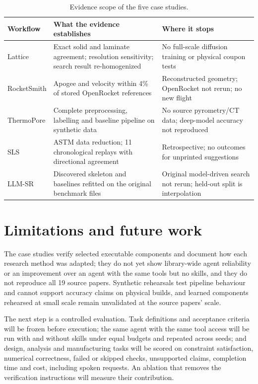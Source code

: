 \documentclass[11pt]{article}
\begin{document}
\begin{table}[t]
\centering\small
\caption{Evidence scope of the five case studies.}
\label{tab:rerun-scope}
\begin{tabularx}{\textwidth}{@{}>{\raggedright\arraybackslash}p{2.2cm} >{\raggedright\arraybackslash}X >{\raggedright\arraybackslash}X@{}}
\toprule
Workflow & What the evidence establishes & Where it stops\\
\midrule
Lattice & Exact solid and laminate agreement; resolution sensitivity; search result re-homogenized & No full-scale diffusion training or physical coupon tests\\[3pt]
RocketSmith & Apogee and velocity within 4\% of stored OpenRocket references & Reconstructed geometry; OpenRocket not rerun; no new flight\\[3pt]
ThermoPore & Complete preprocessing, labelling and baseline pipeline on synthetic data & No source pyrometry/CT data; deep-model accuracy not reproduced\\[3pt]
SLS & ASTM data reduction; 11 chronological replays with directional agreement & Retrospective; no outcomes for unprinted suggestions\\[3pt]
LLM-SR & Discovered skeleton and baselines refitted on the original benchmark files & Original model-driven search not rerun; held-out split is interpolation\\
\bottomrule
\end{tabularx}
\end{table}

\section{Limitations and future work}
\label{sec:limits}
The case studies verify selected executable components and document how each research method was
adapted; they do not yet show library-wide agent reliability or an improvement over an agent with
the same tools but no skills, and they do not reproduce all 19 source papers. Synthetic rehearsals
test pipeline behaviour and cannot support accuracy claims on physical builds, and learned
components rehearsed at small scale remain unvalidated at the source papers' scale.

The next step is a controlled evaluation. Task definitions and acceptance criteria will be frozen
before execution; the same agent with the same tool access will be run with and without skills
under equal budgets and repeated across seeds; and design, analysis and manufacturing tasks will be
scored on constraint satisfaction, numerical correctness, failed or skipped checks, unsupported
claims, completion time and cost, including spoken requests. An ablation that removes the
verification instructions will measure their contribution.
\end{document}
